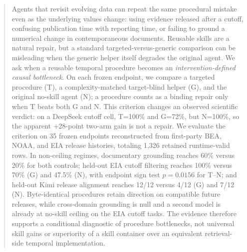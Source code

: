 \begin{abstract}
Agents that revisit evolving data can repeat the same procedural mistake even as the underlying values change: using evidence released after a cutoff, confusing publication time with reporting time, or failing to ground a numerical change in contemporaneous documents. Reusable skills are a natural repair, but a standard targeted-versus-generic comparison can be misleading when the generic helper itself degrades the original agent. We ask when a reusable temporal procedure becomes an \emph{intervention-defined causal bottleneck}. On each frozen endpoint, we compare a targeted procedure (T), a complexity-matched target-blind helper (G), and the original no-skill agent (N); a procedure counts as a binding repair only when T beats both G and N. This criterion changes an observed scientific verdict: on a DeepSeek cutoff cell, T=100\% and G=72\%, but N=100\%, so the apparent +28-point two-arm gain is not a repair. We evaluate the criterion on 35 frozen endpoints reconstructed from first-party BEA, NOAA, and EIA release histories, totaling 1,326 retained runtime-valid rows. In non-ceiling regimes, documentary grounding reaches 60\% versus 20\% for both controls; held-out EIA cutoff filtering reaches 100\% versus 70\% (G) and 47.5\% (N), with endpoint sign test $p=0.0156$ for T--N; and held-out Kimi release alignment reaches 12/12 versus 4/12 (G) and 7/12 (N). Byte-identical procedures retain direction on compatible future releases, while cross-domain grounding is null and a second model is already at no-skill ceiling on the EIA cutoff tasks. The evidence therefore supports a conditional diagnostic of procedure bottlenecks, not universal skill gains or superiority of a skill container over an equivalent retrieval-side temporal implementation.
\end{abstract}
